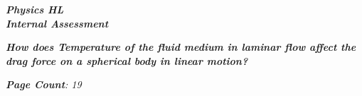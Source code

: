 

\begin{titlepage}
    \begin{center}
        \vspace*{1cm}
            
        \date{}
            
        \huge
            
        \textit{\textbf{Physics HL \\ Internal Assessment}}
            
        \vspace{0.25cm}
            
            
        \vspace{2.5cm}
            
            
            
        \vspace{2.5cm}
            
        \LARGE
            
        \textit{\textbf{How does Temperature of the fluid medium in laminar flow affect the drag force on a spherical body in linear motion? }}


		\vspace{1.5cm}
            
        \vspace{2.5cm}
            
        \Large
            
        \vspace{0.25cm}
        

		\vspace{1cm}            
            
		\Large		
		        
		\vspace{0.25cm} 
		


		\textit{\textbf{Page Count}: 19}
		   

\end{center}
\end{titlepage}
